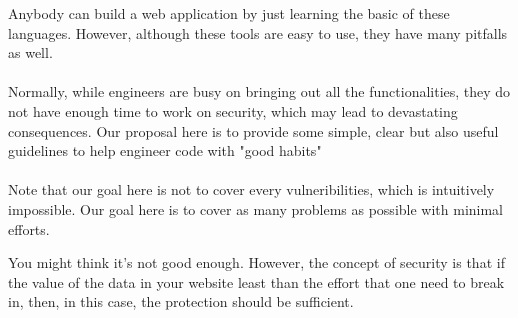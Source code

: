\documentclass[12pt, a4paper]{article}
\begin{document}
Anybody can build a web application by just learning the basic of these languages.
However, although these tools are easy to use,
they have many pitfalls as well.
\\\\
Normally, while engineers are busy on bringing out all the functionalities,
they do not have enough time to work on security, which may lead to devastating
consequences. Our proposal here is to provide some simple, clear but also
useful guidelines to help engineer code with "good habits"
\\\\
Note that our goal here is not to cover every vulneribilities, which is intuitively impossible.
Our goal here is to cover as many problems as possible with minimal efforts.

You might think it's not good enough.
However, the concept of security is that if the value of the data in your website
least than the effort that one need to break in, then, in this case,
the protection should be sufficient.
%
%
%
%
%
\end{document}
